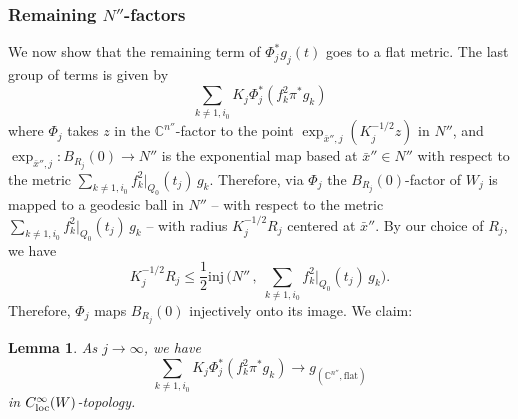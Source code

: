 \documentclass[11pt]{amsart}
\theoremstyle{plain}
\numberwithin{equation}{section}
\newtheorem{lemma}[theorem]{Lemma}
\theoremstyle{definition}
\theoremstyle{remark}
\begin{document}
\subsubsection{Remaining $N''$-factors} We now show that the remaining term of $\Phi_j^*g_j(t)$ goes to a flat metric.  The last group of terms is given by
\[\sum_{k\not=1,i_0} K_j \Phi_j^*(f_k^2 \pi^*g_k)\]
where $\Phi_j$ takes $z$ in the $\mathbb{C}^{n''}$-factor to the point $\exp_{\bar{x}'',j}(K_j^{-1/2}z)$ in $N''$, and $\exp_{\bar{x}'',j} : B_{R_j}(0) \to N''$ is the exponential map based at $\bar{x}'' \in N''$ with respect to the metric $\sum_{k \neq 1, i_0} f_k^2 |_{Q_0} ( t_j ) \, g_k$. Therefore, via $\Phi_j$ the $B_{R_j}(0)$-factor of $W_j$ is mapped to a geodesic ball in $N''$ -- with respect to the metric $\sum_{k \neq 1, i_0} f_k^2 |_{Q_0} ( t_j ) \, g_k$ -- with radius $K_j^{-1/2}R_j$ centered at $\bar{x}''$. By our choice of $R_j$, we have
\[K_j^{-1/2}R_j \leq \frac{1}{2}\textrm{inj}\,\Big( N'' \, , \; \sum_{k \neq 1, i_0} f_k^2 |_{Q_0} ( t_j ) \, g_k \Big).\]
Therefore, $\Phi_j$ maps $B_{R_j}(0)$ injectively onto its image. We claim:
\begin{lemma}
\label{lma:flat}
As $j \to \infty$, we have
\[\sum_{k\not=1,i_0}K_j\Phi_j^*(f_k^2\pi^*g_k) \to g_{(\mathbb{C}^{n''}, \text{flat})}\]
in $C^\infty_{\textup{loc}}(W)$-topology.
\end{lemma}
\end{document}

